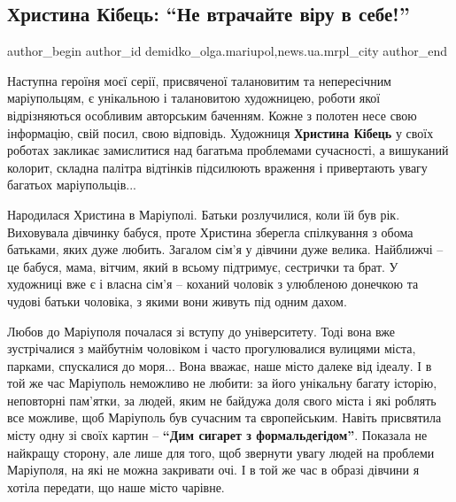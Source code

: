  
 
 
 
 
 
\subsection{Христина Кібець: \enquote{Не втрачайте віру в себе!}}
\label{sec:20_02_2020.stz.news.ua.mrpl_city.1.hrystyna_kibec_vira_v_sebe}
 
\ifcmt
 author_begin
   author_id demidko_olga.mariupol,news.ua.mrpl_city
 author_end
\fi

Наступна героїня моєї серії, присвяченої талановитим та непересічним
маріупольцям, є унікальною і талановитою художницею, роботи якої відрізняються
особливим авторським баченням. Кожне з полотен несе свою інформацію, свій
посил, свою відповідь. Художниця \textbf{Христина Кібець} у своїх роботах закликає
замислитися над багатьма проблемами сучасності, а вишуканий колорит, складна
палітра відтінків підсилюють враження і привертають увагу багатьох
маріупольців...

Народилася Христина в Маріуполі. Батьки розлучилися, коли їй був рік.
Виховувала дівчинку бабуся, проте Христина зберегла спілкування з обома
батьками, яких дуже любить. Загалом сім'я у дівчини дуже велика. Найближчі – це
бабуся, мама, вітчим, який в всьому підтримує, сестрички та брат. У художниці
вже є і власна сім'я – коханий чоловік з улюбленою донечкою та чудові батьки
чоловіка, з якими вони живуть під одним дахом.


Любов до Маріуполя почалася зі вступу до університету. Тоді вона вже
зустрічалися з майбутнім чоловіком і часто прогулювалися вулицями міста,
парками, спускалися до моря... Вона вважає, наше місто далеке від ідеалу. І в той
же час Маріуполь неможливо не любити: за його унікальну багату історію,
неповторні пам'ятки, за людей, яким не байдужа доля свого міста і які роблять
все можливе, щоб Маріуполь був сучасним та європейським. Навіть присвятила
місту одну зі своїх картин – \textbf{\enquote{Дим сигарет з формальдегідом}}. Показала не
найкращу сторону, але лише для того, щоб звернути увагу людей на проблеми
Маріуполя, на які не можна закривати очі. І в той же час в образі дівчини я
хотіла передати, що наше місто чарівне.

